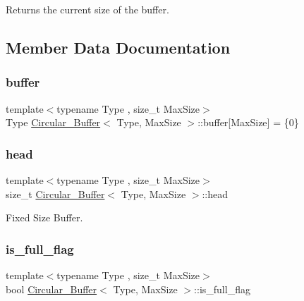 Returns the current size of the buffer. 



\subsection{Member Data Documentation}
\mbox{\label{classCircular__Buffer_a87052e6c88b063be5bac3c2d4fc82989}} 
\subsubsection{\texorpdfstring{buffer}{buffer}}
{\footnotesize\ttfamily template$<$typename Type , size\+\_\+t Max\+Size$>$ \\
Type \hyperlink{classCircular__Buffer}{Circular\+\_\+\+Buffer}$<$ Type, Max\+Size $>$\+::buffer\mbox{[}Max\+Size\mbox{]} = \{0\}\hspace{0.3cm}{\ttfamily [private]}}

\mbox{\label{classCircular__Buffer_aba63ebc4317ca05a35cfbd36e9291787}} 
\subsubsection{\texorpdfstring{head}{head}}
{\footnotesize\ttfamily template$<$typename Type , size\+\_\+t Max\+Size$>$ \\
size\+\_\+t \hyperlink{classCircular__Buffer}{Circular\+\_\+\+Buffer}$<$ Type, Max\+Size $>$\+::head\hspace{0.3cm}{\ttfamily [private]}}



Fixed Size Buffer. 

\mbox{\label{classCircular__Buffer_ad7a89f42768bbc146159221a0f101154}} 
\subsubsection{\texorpdfstring{is\+\_\+full\+\_\+flag}{is\_full\_flag}}
{\footnotesize\ttfamily template$<$typename Type , size\+\_\+t Max\+Size$>$ \\
bool \hyperlink{classCircular__Buffer}{Circular\+\_\+\+Buffer}$<$ Type, Max\+Size $>$\+::is\+\_\+full\+\_\+flag\hspace{0.3cm}{\ttfamily [private]}}



